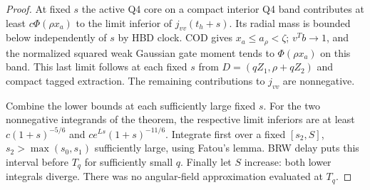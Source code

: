 \documentclass[11pt]{article}
\begin{document}
\begin{proof}
At fixed $s$ the active Q4 core on a compact interior Q4 band
contributes at least $c\Phi(\rho x_a)$ to the limit inferior of
$j_{vv}(t_h+s)$. Its radial mass is bounded below independently
of $s$ by HBD clock. COD gives $x_a\le a_\rho<\zeta$; $v^Tb\to1$,
and the normalized squared weak Gaussian gate moment tends to
$\Phi(\rho x_a)$ on this band. This last limit follows at each fixed
$s$ from $D=(q Z_1,\rho+qZ_2)$ and compact tagged extraction.
The remaining contributions to $j_{vv}$ are nonnegative.

Combine the lower bounds at each sufficiently large fixed $s$.
For the two nonnegative integrands of the theorem, the respective
limit inferiors are at least $c(1+s)^{-5/6}$ and
$c e^{Ls}(1+s)^{-11/6}$. Integrate first over a fixed
$[s_2,S]$, $s_2>\max(s_0,s_1)$ sufficiently large, using Fatou's
lemma. BRW delay puts this interval before $T_q$ for sufficiently
small $q$. Finally let $S$ increase: both lower integrals diverge.
There was no angular-field approximation evaluated at $T_q$.
\end{proof}
\end{document}
